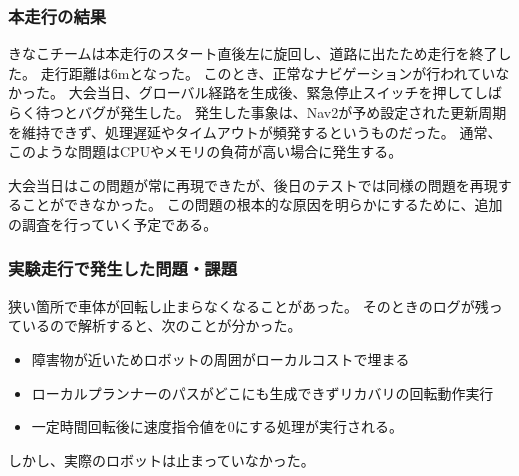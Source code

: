 \subsubsection{本走行の結果}
きなこチームは本走行のスタート直後左に旋回し、道路に出たため走行を終了した。
走行距離は6mとなった。
このとき、正常なナビゲーションが行われていなかった。
大会当日、グローバル経路を生成後、緊急停止スイッチを押してしばらく待つとバグが発生した。
発生した事象は、Nav2が予め設定された更新周期を維持できず、処理遅延やタイムアウトが頻発するというものだった。
通常、このような問題はCPUやメモリの負荷が高い場合に発生する。

大会当日はこの問題が常に再現できたが、後日のテストでは同様の問題を再現することができなかった。
この問題の根本的な原因を明らかにするために、追加の調査を行っていく予定である。

\subsubsection{実験走行で発生した問題・課題}
狭い箇所で車体が回転し止まらなくなることがあった。
そのときのログが残っているので解析すると、次のことが分かった。

\begin{itemize}
  \item 障害物が近いためロボットの周囲がローカルコストで埋まる
  \item ローカルプランナーのパスがどこにも生成できずリカバリの回転動作実行
  \item  一定時間回転後に速度指令値を0にする処理が実行される。
\end{itemize}
しかし、実際のロボットは止まっていなかった。




